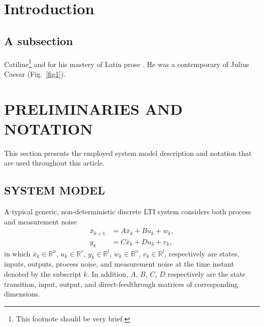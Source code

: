 \documentclass[twocolumn]{autart}    %
\begin{document}
\section{Introduction}




\subsection{A subsection}
Catiline\footnote{
This footnote should be very brief.}
and for his mastery of Latin prose \cite{Heritage:92}. He was a 
contemporary of Julius Caesar (Fig.~\ref{fig1}).

\section{PRELIMINARIES AND NOTATION}
This section presents the employed system model description and notation that are used throughout this article.

\subsection{SYSTEM MODEL}
A typical generic, non-deterministic discrete \ac{LTI} system considers both process and measurement noise
\begin{subequations}\label{eqn:SS_wv}
\begin{align}
	\bar{x}_{k+1} &= A\bar{x}_k + Bu_k + w_k,\label{eqn:SSwv_x}\\
	y_k &= C\bar{x}_k + Du_k + v_k \label{eqn:SSwv_y},
\end{align}
\end{subequations}
in which ${\bar{x}_k\in\mathbb{R}^n}$, ${u_k\in\mathbb{R}^r}$, ${y_k\in\mathbb{R}^l}$, ${w_k\in\mathbb{R}^n}$, ${v_k\in\mathbb{R}^l}$, respectively are states, inputs, outputs, process noise, and measurement noise at the time instant denoted by the subscript $k$. In addition, $A$, $B$, $C$, $D$ respectively are the state transition, input, output, and direct-feedthrough matrices of corresponding dimensions.
\end{document}
